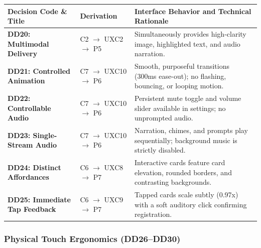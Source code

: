 \begin{xltabular}{\textwidth}{|p{3.5cm}|p{2.5cm}|X|}
\hline
\textbf{Decision Code \& Title} & \textbf{Derivation} & \textbf{Interface Behavior and Technical Rationale} \\ \hline
\endhead
\textbf{DD20: Multimodal Delivery} & C2 $\rightarrow$ UXC2 $\rightarrow$ P5 & Simultaneously provides high-clarity image, highlighted text, and audio narration. \\ \hline
\textbf{DD21: Controlled Animation} & C7 $\rightarrow$ UXC10 $\rightarrow$ P6 & Smooth, purposeful transitions (300ms ease-out); no flashing, bouncing, or looping motion. \\ \hline
\textbf{DD22: Controllable Audio} & C7 $\rightarrow$ UXC10 $\rightarrow$ P6 & Persistent mute toggle and volume slider available in settings; no unprompted audio. \\ \hline
\textbf{DD23: Single-Stream Audio} & C7 $\rightarrow$ UXC10 $\rightarrow$ P6 & Narration, chimes, and prompts play sequentially; background music is strictly disabled. \\ \hline
\textbf{DD24: Distinct Affordances} & C6 $\rightarrow$ UXC8 $\rightarrow$ P7 & Interactive cards feature card elevation, rounded borders, and contrasting backgrounds. \\ \hline
\textbf{DD25: Immediate Tap Feedback} & C6 $\rightarrow$ UXC9 $\rightarrow$ P7 & Tapped cards scale subtly (0.97x) with a soft auditory click confirming registration. \\ \hline
\end{xltabular}
\label{tab:c5_dd_sensory}

\subsubsection{Physical Touch Ergonomics (DD26--DD30)}

